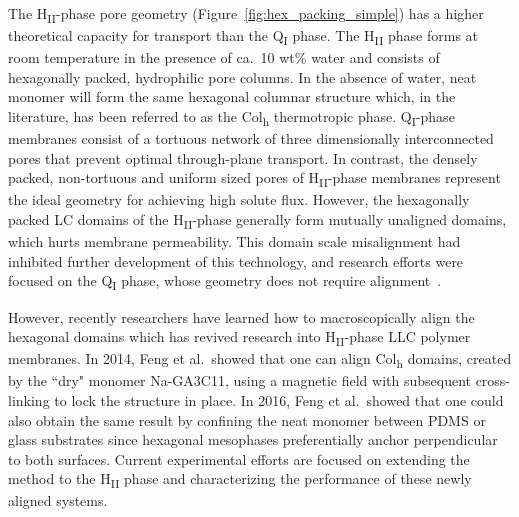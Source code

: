 \documentclass[journal=jpcbfk,manuscript=article]{achemso}
\begin{document}
  The H\textsubscript{II}-phase pore geometry (Figure~\ref{fig:hex_packing_simple}) has a
  higher theoretical capacity for transport than the Q\textsubscript{I} phase.
  The H\textsubscript{II} phase forms at room temperature in the presence of
  ca.~10 wt\% water and consists of hexagonally packed, hydrophilic pore
  columns\cite{smith_ordered_1997}. In the absence of water, neat monomer will
  form the same hexagonal columnar structure which, in the literature, has been
  referred to as the Col\textsubscript{h} thermotropic
  phase\cite{feng_scalable_2014}. Q\textsubscript{I}-phase membranes consist of
  a tortuous network of three dimensionally interconnected pores that prevent
  optimal through-plane transport. In contrast, the densely packed, non-tortuous
  and uniform sized pores of H\textsubscript{II}-phase membranes represent the
  ideal geometry for achieving high solute
  flux\cite{matyka_tortuosity-porosity_2008}. However, the hexagonally packed LC
  domains of the H\textsubscript{II}-phase generally form mutually unaligned
  domains, which hurts membrane permeability. This domain scale misalignment had
  inhibited further development of this technology, and research efforts were
  focused on the Q\textsubscript{I} phase, whose geometry does not require
  alignment~\cite{zhou_new_2007}. 

  However, recently researchers have learned how to macroscopically align the
  hexagonal domains which has revived research into H\textsubscript{II}-phase LLC
  polymer membranes. In 2014, Feng et al.~showed that one can align Col\textsubscript{h}
  domains, created by the ``dry" monomer Na-GA3C11, using a magnetic field
  with subsequent cross-linking to lock the structure in
  place\cite{feng_scalable_2014}. In 2016, Feng et al.~showed that one could
  also obtain the same result by confining the neat monomer between PDMS or glass
  substrates since hexagonal mesophases preferentially anchor perpendicular to
  both surfaces\cite{feng_thin_2016}. Current experimental efforts are focused
  on extending the method to the H\textsubscript{II} phase and characterizing
  the performance of these newly aligned systems.
\end{document}
